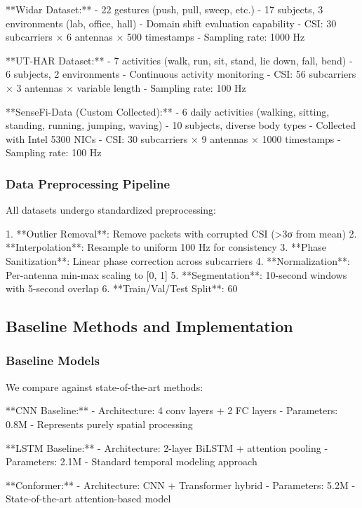 \documentclass[10pt,journal,compsoc]{IEEEtran}
\begin{document}
**Widar Dataset:**
- 22 gestures (push, pull, sweep, etc.)
- 17 subjects, 3 environments (lab, office, hall)
- Domain shift evaluation capability
- CSI: 30 subcarriers × 6 antennas × 500 timestamps
- Sampling rate: 1000 Hz

**UT-HAR Dataset:**
- 7 activities (walk, run, sit, stand, lie down, fall, bend)
- 6 subjects, 2 environments
- Continuous activity monitoring
- CSI: 56 subcarriers × 3 antennas × variable length
- Sampling rate: 100 Hz

**SenseFi-Data (Custom Collected):**
- 6 daily activities (walking, sitting, standing, running, jumping, waving)
- 10 subjects, diverse body types
- Collected with Intel 5300 NICs
- CSI: 30 subcarriers × 9 antennas × 1000 timestamps
- Sampling rate: 100 Hz

\subsubsection{Data Preprocessing Pipeline}

All datasets undergo standardized preprocessing:

1. **Outlier Removal**: Remove packets with corrupted CSI (>3σ from mean)
2. **Interpolation**: Resample to uniform 100 Hz for consistency
3. **Phase Sanitization**: Linear phase correction across subcarriers
4. **Normalization**: Per-antenna min-max scaling to [0, 1]
5. **Segmentation**: 10-second windows with 5-second overlap
6. **Train/Val/Test Split**: 60%

\subsection{Baseline Methods and Implementation}

\subsubsection{Baseline Models}

We compare against state-of-the-art methods:

**CNN Baseline:**
- Architecture: 4 conv layers + 2 FC layers
- Parameters: 0.8M
- Represents purely spatial processing

**LSTM Baseline:**
- Architecture: 2-layer BiLSTM + attention pooling
- Parameters: 2.1M
- Standard temporal modeling approach

**Conformer:**
- Architecture: CNN + Transformer hybrid
- Parameters: 5.2M
- State-of-the-art attention-based model
\end{document}
